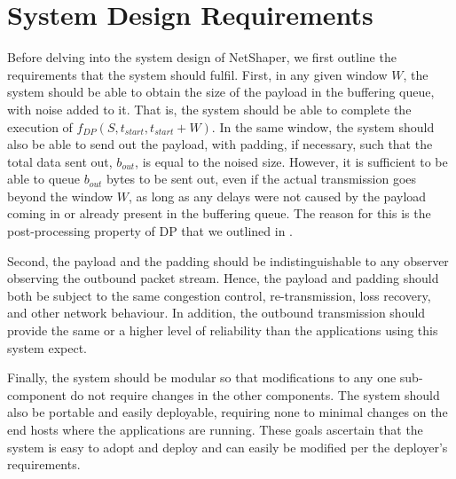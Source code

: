 \section{System Design Requirements}
\label{sec:netshaper-system-requirements}

Before delving into the system design of NetShaper, we first outline the requirements that the system should fulfil.
First, in any given window $W$, the system should be able to obtain the size of the payload in the buffering queue, with noise added to it. 
That is, the system should be able to complete the execution of $f_{DP}(S, t_{start}, t_{start} + W)$.
In the same window, the system should also be able to send out the payload, with padding, if necessary, such that the total data sent out, $b_{out}$, is equal to the noised size. 
However, it is sufficient to be able to queue $b_{out}$ bytes to be sent out, even if the actual transmission goes beyond the window $W$, as long as any delays were not caused by the payload coming in or already present in the buffering queue. 
The reason for this is the post-processing property of DP that we outlined in .

Second, the payload and the padding should be indistinguishable to any observer observing the outbound packet stream.
Hence, the payload and padding should both be subject to the same congestion control, re-transmission, loss recovery, and other network behaviour.
In addition, the outbound transmission should provide the same or a higher level of reliability than the applications using this system expect.

Finally, the system should be modular so that modifications to any one sub-component do not require changes in the other components.
The system should also be portable and easily deployable, requiring none to minimal changes on the end hosts where the applications are running.
These goals ascertain that the system is easy to adopt and deploy and can easily be modified per the deployer's requirements.

\endinput

1. Complete DP measurement within the window W
2. Data and Dummy should be indistinguishable
3. Should provide the same level of reliability the application expects
4. Should be modular for easy modification to sub-components
5. Should be portable and easily deployable, with minimal modifications of the end-hosts.
